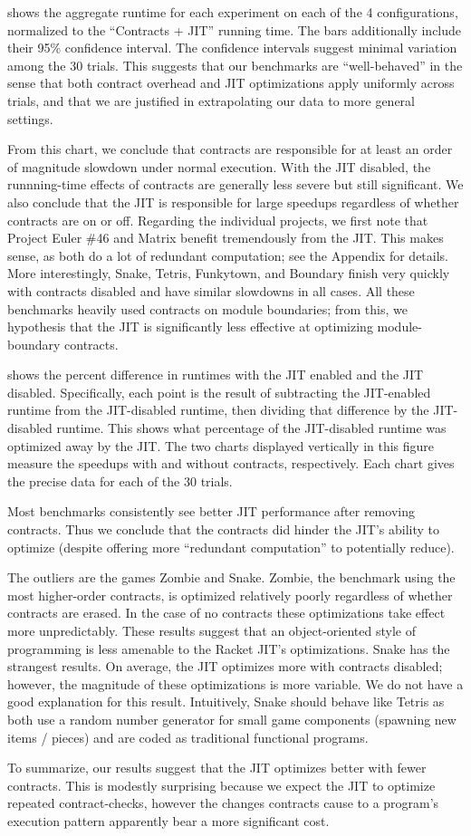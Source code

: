  shows the aggregate runtime for each experiment on each of the 4 configurations, normalized to the ``Contracts + JIT'' running time.
The bars additionally include their 95\% confidence interval.
The confidence intervals suggest minimal variation among the 30 trials.
This suggests that our benchmarks are ``well-behaved'' in the sense that both contract overhead and JIT optimizations apply uniformly across trials, and that we are justified in extrapolating our data to more general settings.

From this chart, we conclude that contracts are responsible for at least an order of magnitude slowdown under normal execution.
With the JIT disabled, the runnning-time effects of contracts are generally less severe but still significant.
We also conclude that the JIT is responsible for large speedups regardless of whether contracts are on or off.
Regarding the individual projects, we first note that Project Euler \#46 and Matrix benefit tremendously from the JIT.
This makes sense, as both do a lot of redundant computation; see the Appendix for details.
More interestingly, Snake, Tetris, Funkytown, and Boundary finish very quickly with contracts disabled and have similar slowdowns in all cases.
All these benchmarks heavily used contracts on module boundaries; from this, we hypothesis that the JIT is significantly less effective at optimizing module-boundary contracts.



 shows the percent difference in runtimes with the JIT enabled and the JIT disabled.
Specifically, each point is the result of subtracting the JIT-enabled runtime from the JIT-disabled runtime, then dividing that difference by the JIT-disabled runtime.
This shows what percentage of the JIT-disabled runtime was optimized away by the JIT.
The two charts displayed vertically in this figure measure the speedups with and without contracts, respectively.
Each chart gives the precise data for each of the 30 trials.

Most benchmarks consistently see better JIT performance after removing contracts.
Thus we conclude that the contracts did hinder the JIT's ability to optimize (despite offering more ``redundant computation'' to potentially reduce).

The outliers are the games Zombie and Snake.
Zombie, the benchmark using the most higher-order contracts, is optimized relatively poorly regardless of whether contracts are erased.
In the case of no contracts these optimizations take effect more unpredictably.
These results suggest that an object-oriented style of programming is less amenable to the Racket JIT's optimizations.
Snake has the strangest results.
On average, the JIT optimizes more with contracts disabled; however, the magnitude of these optimizations is more variable.
We do not have a good explanation for this result.
Intuitively, Snake should behave like Tetris as both use a random number generator for small game components (spawning new items / pieces) and are coded as traditional functional programs.

To summarize, our results suggest that the JIT optimizes better with fewer contracts.
This is modestly surprising because we expect the JIT to optimize repeated contract-checks, however the changes contracts cause to a program's execution pattern apparently bear a more significant cost.

